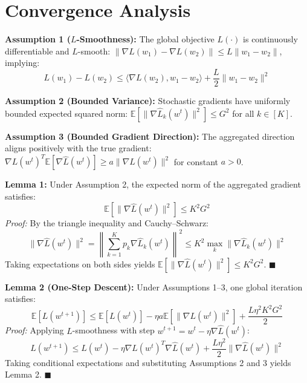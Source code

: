\documentclass[12pt,a4paper]{report}
\begin{document}
\section{Convergence Analysis}
\noindent \textbf{Assumption 1 ($L$-Smoothness):} The global objective $L(\cdot)$ is continuously differentiable and $L$-smooth: $\|\nabla L(w_1) - \nabla L(w_2)\| \le L\|w_1 - w_2\|$, implying:
\begin{equation}
    L(w_1) - L(w_2) \le \langle \nabla L(w_2), w_1 - w_2 \rangle + \frac{L}{2}\|w_1 - w_2\|^2
\end{equation}

\noindent \textbf{Assumption 2 (Bounded Variance):} Stochastic gradients have uniformly bounded expected squared norm: $\mathbb{E}[\|\nabla \hat{L}_k(w^t)\|^2] \le G^2$ for all $k \in [K]$.

\noindent \textbf{Assumption 3 (Bounded Gradient Direction):} The aggregated direction aligns positively with the true gradient: $\nabla L(w^t)^T \mathbb{E}[\nabla \hat{L}(w^t)] \ge a \|\nabla L(w^t)\|^2$ for constant $a > 0$.

\enlargethispage{2\baselineskip}
\noindent \textbf{Lemma 1:} Under Assumption 2, the expected norm of the aggregated gradient satisfies:
\begin{equation}
    \mathbb{E}\left[ \|\nabla \hat{L}(w^t)\|^2 \right] \le K^2 G^2
\end{equation}
\noindent \textit{Proof:} By the triangle inequality and Cauchy--Schwarz:
\begin{equation}
    \|\nabla \hat{L}(w^t)\|^2 = \left\| \sum_{k=1}^K p_k \nabla \hat{L}_k(w^t) \right\|^2 \le K^2 \max_{k} \|\nabla \hat{L}_k(w^t)\|^2
\end{equation}
Taking expectations on both sides yields $\mathbb{E}[\|\nabla \hat{L}(w^t)\|^2] \le K^2 G^2$. $\blacksquare$

\noindent \textbf{Lemma 2 (One-Step Descent):} Under Assumptions 1--3, one global iteration satisfies:
\begin{equation}
    \mathbb{E}[L(w^{t+1})] \le \mathbb{E}[L(w^t)] - \eta a \mathbb{E}[\|\nabla L(w^t)\|^2] + \frac{L\eta^2 K^2 G^2}{2}
\end{equation}
\noindent \textit{Proof:} Applying $L$-smoothness with step $w^{t+1} = w^t - \eta \nabla \hat{L}(w^t)$:
\begin{equation}
    L(w^{t+1}) \le L(w^t) - \eta \nabla L(w^t)^T \nabla \hat{L}(w^t) + \frac{L\eta^2}{2}\|\nabla \hat{L}(w^t)\|^2
\end{equation}
Taking conditional expectations and substituting Assumptions 2 and 3 yields Lemma 2. $\blacksquare$
\end{document}
